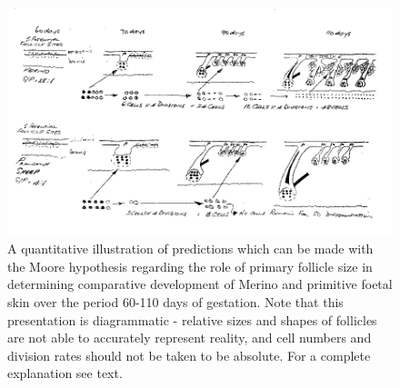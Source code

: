 %

\begin{landscape}
\begin{figure}[h]
  \centering
  \includegraphics[width=1.9\textwidth,trim = 20 0 0 80]{images/fig16.png}
  \caption{  A quantitative illustration of predictions which can be made with
      the Moore hypothesis regarding the role of primary follicle size
      in determining comparative development of Merino and primitive
      foetal skin over the period 60-110 days of gestation.  Note that
      this presentation is diagrammatic - relative sizes and shapes of
      follicles are not able to accurately represent reality, and cell
      numbers and division rates should not be taken to be absolute.
      For a complete explanation see text.}
  \label{fig:16}
\end{figure}
\end{landscape}

%
